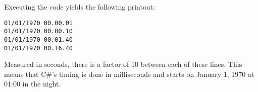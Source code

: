 \inputminted{csharp}{\context/answer/DateTest.cs}

Executing the code yields the following printout:
\begin{verbatim}
01/01/1970 00.00.01
01/01/1970 00.00.10
01/01/1970 00.01.40
01/01/1970 00.16.40
\end{verbatim}

Measured in seconds, there is a factor of $10$ between each of these lines. This means that C\#'s timing is done in milliseconds and starts on January 1, 1970 at 01:00 in the night.

